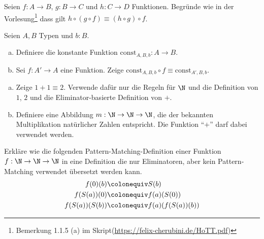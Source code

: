 \documentclass{hott-übung}
\begin{document}
\setcounter{blattnummer}{1}
\setcounter{aufgabennummer}{0}

\blatt

  Seien $f:A\to B$, $g:B\to C$ und $h:C\to D$ Funktionen.
  Begründe wie in der Vorlesung\footnote{Bemerkung 1.1.5 (a) im Skript(\url{https://felix-cherubini.de/HoTT.pdf})} dass gilt $h\circ(g\circ f)\equiv (h\circ g)\circ f$.

  Seien $A,B$ Typen und $b:B$.
  \begin{enumerate}[(a)]
    \item Definiere die konstante Funktion $\mathrm{const}_{A,B,b}:A\to B$.
    \item Sei $f:A'\to A$ eine Funktion.
      Zeige $\mathrm{const}_{A,B,b}\circ f \equiv \mathrm{const}_{A',B,b}$.
  \end{enumerate}

\aufgabe{}
\begin{enumerate}[(a)]
\item Zeige $1+1\equiv 2$. Verwende dafür nur die Regeln für $\N$ und die Definition von $1$, $2$ und die Eliminator-basierte Definition von $+$.
\item Definiere eine Abbildung $m:\N\to\N\to\N$, die der bekannten Multiplikation natürlicher Zahlen entspricht. Die Funktion ``$+$'' darf dabei verwendet werden.
\end{enumerate}
  
  Erkläre wie die folgenden Pattern-Matching-Definition einer Funktion $f:\N\to\N\to\N$ in eine
  Definition die nur Eliminatoren, aber kein Pattern-Matching verwendet übersetzt werden kann.
  \begin{align*}
    f(0)(b) &\colonequiv S(b) \\
    f(S(a))(0) &\colonequiv f(a)(S(0)) \\
    f(S(a))(S(b)) &\colonequiv f(a)(f(S(a))(b))
  \end{align*}
\end{document}
